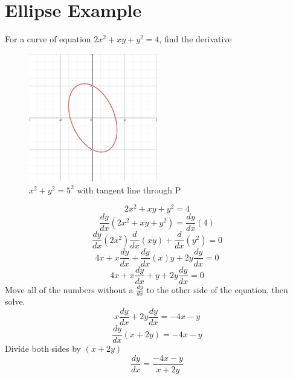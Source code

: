 \documentclass{article}
\begin{document}
\section{Ellipse Example} 
For a curve of equation $2x^2 + xy + y^2 = 4$, find the derivative
\begin{figure}[h]
\caption{$x^2 + y^2 = 5^2$ with tangent line through P}
\centering
\includegraphics[width=0.5\textwidth]{Ellipse1.png}
\end{figure}
\begin{equation}
2x^2 + xy + y^2 = 4
\end{equation}
\begin{equation}
\frac{dy}{dx}(2x^2 + xy + y^2) = \frac{dy}{dx}(4)
\end{equation}
\begin{equation}
\frac{dy}{dx}(2x^2)\frac{d}{dx}(xy)+\frac{d}{dx}(y^2) = 0
\end{equation}
\begin{equation}
4x + x \frac{dy}{dx} + \frac{dy}{dx}(x)y + 2y\frac{dy}{dx} = 0
\end{equation}
\begin{equation}
4x + x \frac{dy}{dx} + y + 2y \frac{dy}{dx} = 0
\end{equation}
Move all of the numbers without a $\frac{dy}{dx}$ to the other side of the equation, then solve.
\begin{equation}
x \frac{dy}{dx} + 2y \frac{dy}{dx} = -4x-y
\end{equation}
\begin{equation}
\frac{dy}{dx}(x + 2y) = -4x-y
\end{equation}
Divide both sides by $(x+2y)$
\begin{equation}
\frac{dy}{dx} = \frac{-4x-y}{x+2y}
\end{equation}
\end{document}
